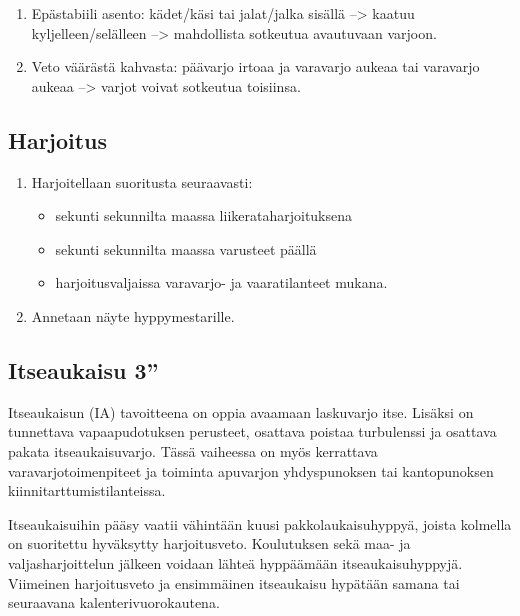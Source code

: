 \begin{multicols}{2}
\begin{enumerate}[label=\bfseries \arabic*)]
\item  Epästabiili asento: kädet/käsi tai jalat/jalka sisällä --> kaatuu kyljelleen/selälleen --> mahdollista sotkeutua avautuvaan varjoon. 
\item  Veto väärästä kahvasta: päävarjo irtoaa ja varavarjo aukeaa tai varavarjo aukeaa --> varjot voivat sotkeutua toisiinsa. 
\end{enumerate}
\subsection{ Harjoitus }
\label{pl-alkeiskoulutuksen-suoritukset-harjoitus}

\begin{enumerate}[label=\bfseries \arabic*)]
\item  Harjoitellaan suoritusta seuraavasti: 
	\begin{itemize}
	\item  sekunti sekunnilta maassa liikerataharjoituksena 
	\item  sekunti sekunnilta maassa varusteet päällä 
	\item  harjoitusvaljaissa varavarjo- ja vaaratilanteet mukana. 
	\end{itemize}
\item  Annetaan näyte hyppymestarille. 
\end{enumerate}

\end{multicols}\pagebreak\begin{multicols}{2} 

\section{ Itseaukaisu 3'' }
\label{pl-alkeiskoulutuksen-suoritukset-itseaukaisu-3}


Itseaukaisun (IA) tavoitteena on oppia avaamaan laskuvarjo itse. Lisäksi on tunnettava vapaapudotuksen perusteet, osattava poistaa turbulenssi ja osattava pakata itseaukaisuvarjo. Tässä vaiheessa on myös kerrattava varavarjotoimenpiteet ja toiminta apuvarjon yhdyspunoksen tai kantopunoksen kiinnitarttumistilanteissa. 


Itseaukaisuihin pääsy vaatii vähintään kuusi pakkolaukaisuhyppyä, joista kolmella on suoritettu hyväksytty harjoitusveto. Koulutuksen sekä maa- ja valjasharjoittelun jälkeen voidaan lähteä hyppäämään itseaukaisuhyppyjä. Viimeinen harjoitusveto ja ensimmäinen itseaukaisu hypätään samana tai seuraavana kalenterivuorokautena. 



\end{multicols}
